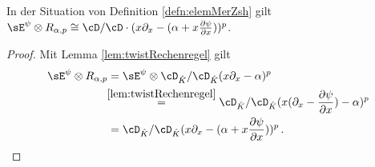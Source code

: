 \begin{lem} In der Situation von Definition \ref{defn:elemMerZsh} gilt
$\sE^{\psi}\otimes R_{\alpha,p}\cong
\cD/\cD\cdot(x\partial_x-(\alpha+x\frac{\partial \psi}{\partial x}))^p$.
\end{lem}
\begin{proof}
Mit Lemma \ref{lem:twistRechenregel} gilt
\begin{align*}
\sE^{\psi}\otimes R_{\alpha,p}
  &=\sE^{\psi}\otimes\cD_{\hat K}/\cD_{\hat K}(x\partial_x-\alpha)^p
\\&\!\!\overset{\ref{lem:twistRechenregel}}{=} \cD_{\hat K}/\cD_{\hat K}
  (x(\partial_x-\frac{\partial \psi}{\partial x})-\alpha)^p
\\&=\cD_{\hat K}/\cD_{\hat K}
  (x\partial_x-(\alpha+x\frac{\partial \psi}{\partial x}))^p \,.
\end{align*}
\end{proof}

